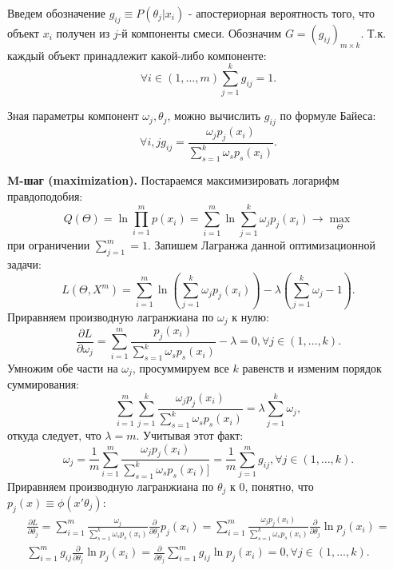 \documentclass[12pt,a4paper]{report}
\begin{document}
Введем обозначение $g_{ij} \equiv P(\theta_j|x_i)$ - апостериорная вероятность того, что объект $x_i$ получен из $j$-й компоненты смеси. Обозначим $G=(g_{ij})_{m \times k}$. Т.к. каждый объект принадлежит какой-либо компоненте:
\begin{equation*}
\forall i \in (1, \dots, m) \sum_{j=1}^{k}g_{ij} = 1.
\end{equation*}

Зная параметры компонент $\omega_j, \theta_j$, можно вычислить $g_{ij}$ по формуле Байеса:
\begin{equation*}
\forall i,j g_{ij} = \frac{\omega_jp_j(x_i)}{\sum_{s=1}^{k}\omega_sp_s(x_i)}.
\end{equation*}

\textbf{M-шаг (maximization).}
Постараемся максимизировать логарифм правдоподобия:
\begin{equation*}
Q(\Theta) = \ln \prod_{i=1}^{m}p(x_i) = \sum_{i=1}^{m}\ln \sum_{j=1}^{k} \omega_jp_j(x_i) \to \max_{\Theta}
\end{equation*}
при ограничении $\sum_{j=1}^{m} = 1$. Запишем Лагранжа данной оптимизационной задачи:
\begin{equation*}
L(\Theta, X^m) = \sum_{i=1}^{m}\ln (\sum_{j=1}^{k}\omega_jp_j(x_i)) - \lambda(\sum_{j=1}^{k}\omega_j - 1).
\end{equation*}
Приравняем производную лагранжиана по $\omega_j$ к нулю:
\begin{equation*}
\frac{\partial L}{\partial \omega_j} = \sum_{i=1}^{m} \frac{p_j(x_i)}{\sum_{s=1}^{k}\omega_sp_s(x_i)} -\lambda = 0, \forall j \in (1, \dots, k).
\end{equation*}
Умножим обе части на $\omega_j$, просуммируем все $k$ равенств и изменим порядок суммирования:
\begin{equation*}
\sum_{i=1}^{m}\sum_{j=1}^{k}\frac{\omega_jp_j(x_i)}{\sum_{s=1}^{k}\omega_sp_s(x_i)} = \lambda \sum_{j=1}^{k}\omega_j,
\end{equation*}
откуда следует, что $\lambda = m$. Учитывая этот факт:
\begin{equation*}
\omega_j = \frac{1}{m} \sum_{i=1}^{m}\frac{\omega_jp_j(x_i)}{\sum_{s=1}^{k}\omega_sp_s(x_i)]} = \frac{1}{m}\sum_{j=1}^m g_{ij}, \forall j \in (1, \dots, k).
\end{equation*}
Приравняем производную лагранжиана по $\theta_j$ к 0, понятно, что $p_j(x) \equiv \phi(x' \theta_j)$:
\begin{eqnarray}
\frac{\partial L}{\partial \theta_j} = \sum_{i=1}^{m} \frac{\omega_j}{\sum_{s=1}^{k}\omega_sp_s(x_i)} \frac{\partial }{\partial \theta_j} p_j(x_i) = 
\sum_{i=1}^{m} \frac{\omega_j p_j(x_i)}{\sum_{s=1}^{k}\omega_sp_s(x_i)} \frac{\partial }{\partial \theta_j} \ln p_j(x_i) = \\
\sum_{i=1}^{m}g_{ij} \frac{\partial }{\partial \theta_j} \ln p_j(x_i) = \frac{\partial }{\partial \theta_j} \sum_{i=1}^{m}g_{ij}  \ln p_j(x_i) = 0, \forall j \in (1, \dots, k).
\end{eqnarray}
\end{document}
